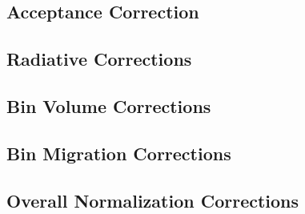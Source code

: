 \subsection{Acceptance Correction}

\subsection{Radiative Corrections}

\subsection{Bin Volume Corrections}
    

\subsection{Bin Migration Corrections}
    
    
\subsection{Overall Normalization Corrections}